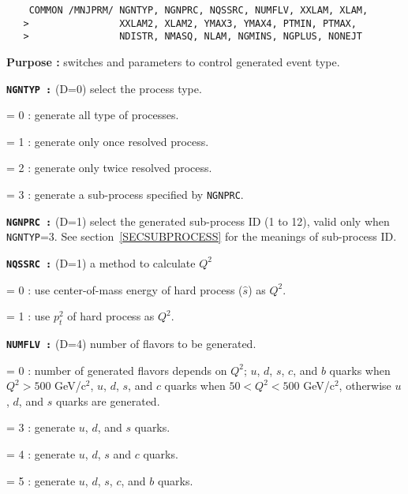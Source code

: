 \newlength{\MNJPRM}
\settowidth{\MNJPRM}{\tt   xCOMMON /MNJPRM/ NGNTYP, NGNPRC, NQSSRC, NUMFLV, XXLAM, XLAM,}
\begin{verbatim}
    COMMON /MNJPRM/ NGNTYP, NGNPRC, NQSSRC, NUMFLV, XXLAM, XLAM,
   >                XXLAM2, XLAM2, YMAX3, YMAX4, PTMIN, PTMAX,
   >                NDISTR, NMASQ, NLAM, NGMINS, NGPLUS, NONEJT
\end{verbatim}
\vspace{-56pt}
\hspace*{3ex}\fbox{\rule[42pt]{\MNJPRM}{0cm}}
\begin{list}{ }{\parsep=0pt \itemsep=0pt \topsep=0pt }
\item[\bf Purpose :] switches and parameters to control generated event
type.  
\item[\bf \tt NGNTYP :] (D=0) select the process type.
  \begin{list}{}{\itemsep=0pt \parsep=0pt \topsep=0pt}
  \item[= 0 :] generate all type of processes.
  \item[= 1 :] generate only once resolved process.
  \item[= 2 :] generate only twice resolved process.
  \item[= 3 :] generate a sub-process specified by {\tt NGNPRC}.
  \end{list}

\item[\bf \tt NGNPRC :] (D=1) select the generated 
sub-process ID (1 to 12),  valid only when {\tt NGNTYP}=3.  
See section~\ref{SECSUBPROCESS} for the meanings of sub-process ID.

\item[\bf \tt NQSSRC :] (D=1) a method to calculate $Q^2$
  \begin{list}{}{\itemsep=0pt \parsep=0pt \topsep=0pt}
  \item[= 0 :] use center-of-mass energy of hard process ($\hat{s}$)
as $Q^2$.
  \item[= 1 :] use $p_t^2$ of hard process as $Q^2$.
  \end{list}

\item[\bf \tt NUMFLV :] (D=4) number of flavors to be generated.
  \begin{list}{}{\itemsep=0pt \parsep=0pt \topsep=0pt}
  \item[= 0 :] number of generated flavors depends on $Q^2$;
$u$, $d$, $s$, $c$, and $b$ quarks when $Q^2 > 500$ GeV/c$^2$, $u$, $d$, $s$,
and $c$ quarks when $50 < Q^2 < 500$ GeV/c$^2$, otherwise $u$, $d$,
and $s$ quarks are generated.
  \item[= 3 :] generate $u$, $d$, and $s$ quarks.
  \item[= 4 :] generate $u$, $d$, $s$ and $c$ quarks.
  \item[= 5 :] generate $u$, $d$, $s$, $c$, and $b$ quarks.
  \end{list}


\end{list}
